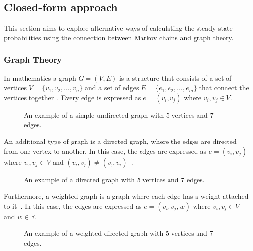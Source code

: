 \subsection{Closed-form approach}

This section aims to explore alternative ways of calculating the steady state
probabilities using the connection between Markov chains and graph
theory.

\subsubsection{Graph Theory}
In mathematics a graph \(G = (V, E)\) is a structure that consists of a set of
vertices \(V = \{v_1, v_2, \dots, v_n\}\) and a set of edges \(E = \{e_1, e_2,
\dots, e_m\}\) that connect the vertices together~\cite{bender2010lists}.
Every edge is expressed as \(e = (v_i, v_j)\) where \(v_i, v_j \in V\).

\begin{figure}[H]
    \centering
    
    \caption{An example of a simple undirected graph with \(5\) vertices and
    \(7\) edges.}
    \label{fig:example_of_graph}
\end{figure}

An additional type of graph is a directed graph, where the edges are directed
from one vertex to another.
In this case, the edges are expressed as \(e = (v_i, v_j)\) where \(v_i, v_j 
\in V\) and \((v_i, v_j) \neq (v_j, v_i)\)~\cite{balakrishnan2012textbook}.

\begin{figure}[H]
    \centering
    
    \caption{An example of a directed graph with \(5\) vertices and \(7\)
    edges.}
    \label{fig:example_of_directed_graph}
\end{figure}

Furthermore, a weighted graph is a graph where each edge has a weight attached
to it~\cite{krukowski2021approximate}.
In this case, the edges are expressed as \(e = (v_i, v_j, w)\) where \(v_i, v_j
\in V\) and \(w \in \mathbb{R}\).

\begin{figure}[H]
    \centering
    
    \caption{An example of a weighted directed graph with \(5\) vertices and
    \(7\) edges.}
    \label{fig:example_of_weighted_directed_graph}
\end{figure}

